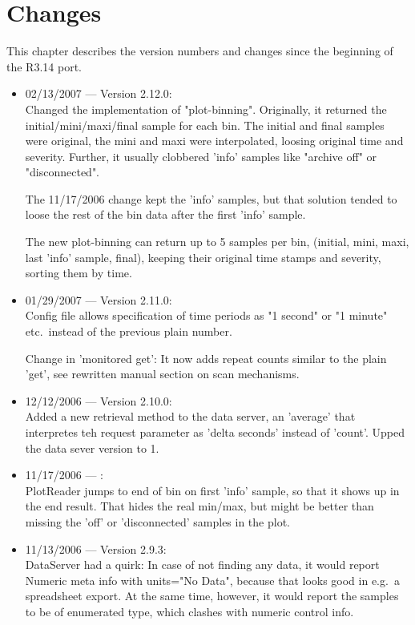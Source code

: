 \chapter{Changes}

This chapter describes the version numbers and changes since
the beginning of the R3.14 port.

\begin{itemize}

\item 02/13/2007 --- Version 2.12.0:\\
Changed the implementation of "plot-binning".
Originally, it returned the initial/mini/maxi/final sample for each bin.
The initial and final samples were original, the mini and maxi were
interpolated, loosing original time and severity.
Further, it usually clobbered 'info' samples like "archive off" or
"disconnected".

The 11/17/2006 change kept the 'info' samples, but that solution
tended to loose the rest of the bin data after the first 'info' sample.

The new plot-binning can return up to 5 samples per bin,
(initial, mini, maxi, last 'info' sample, final), keeping their original
time stamps and severity, sorting them by time.

\item 01/29/2007 --- Version 2.11.0:\\
Config file allows specification of time periods as "1 second" or "1 minute"
etc.\ instead of the previous plain number.

Change in 'monitored get': It now adds repeat counts similar to
the plain 'get', see rewritten manual section on scan mechanisms.

\item 12/12/2006 --- Version 2.10.0:\\
Added a new retrieval method to the data server,
an 'average' that interpretes teh request parameter
as 'delta seconds' instead of 'count'.
Upped the data sever version to 1.

\item 11/17/2006 --- :\\
PlotReader jumps to end of bin on first 'info' sample,
so that it shows up in the end result.
That hides the real min/max, but might be better than missing
the 'off' or 'disconnected' samples in the plot.

\item 11/13/2006 --- Version 2.9.3:\\
DataServer had a quirk:
In case of not finding any data, it would report
Numeric meta info with units="No Data",
because that looks good in e.g.\ a spreadsheet export.
At the same time, however, it would report the samples
to be of enumerated type, which clashes with numeric
control info.


\end{itemize}
